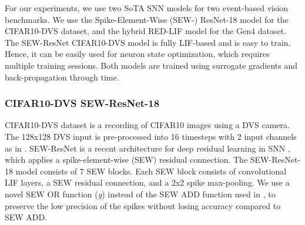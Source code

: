 For our experiments, we use two SoTA SNN models for two event-based vision benchmarks. We use the Spike-Element-Wise (SEW-) ResNet-18\cite{sewresnet} model for the CIFAR10-DVS\cite{10.3389/fnins.2017.00309} dataset, and the hybrid RED-LIF\cite{yik2024neurobench} model for the Gen4 dataset\cite{red}. The SEW-ResNet CIFAR10-DVS model is fully LIF-based and is easy to train. Hence, it can be easily used for neuron state optimization, which requires multiple training sessions. Both models are trained using surrogate gradients and back-propagation through time\cite{8891809}.


\subsubsection{CIFAR10-DVS SEW-ResNet-18}

CIFAR10-DVS dataset \cite{10.3389/fnins.2017.00309} is a recording of CIFAR10 images using a DVS camera. The 128x128 DVS input is pre-processed into 16 timesteps with 2 input channels as in \cite{sewresnet}. SEW-ResNet is a recent architecture for deep residual learning in SNN \cite{sewresnet}, which applies a spike-element-wise (SEW) residual connection. The SEW-ResNet-18 model consists of 7 SEW blocks. Each SEW block consists of convolutional LIF layers, a SEW residual connection, and a 2x2 spike max-pooling. We use a novel SEW OR function (\textit{g}) instead of the SEW ADD function used in \cite{sewresnet}, to preserve the low precision of the spikes without losing accuracy compared to SEW ADD\cite{sewresnet}. 


